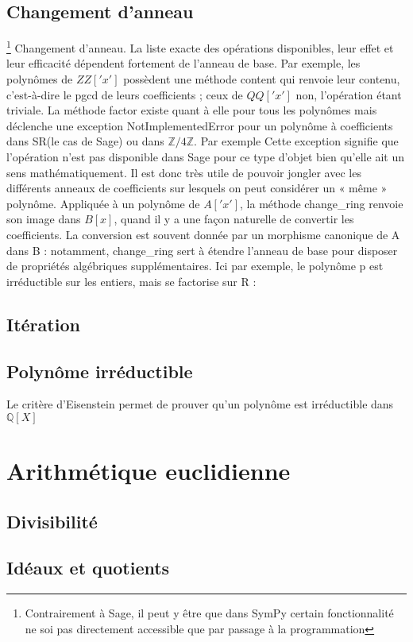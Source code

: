   \subsection{Changement d’anneau}\footnote{Contrairement à Sage, il peut y être que dans SymPy certain 
  fonctionnalité ne soi pas directement accessible que par passage à la programmation }
Changement d’anneau. La liste exacte des opérations disponibles, leur effet
et leur efficacité dépendent fortement de l’anneau de base. Par exemple, les
polynômes de $ZZ\left['x'\right]$ possèdent une méthode content qui renvoie leur contenu,
c’est-à-dire le pgcd de leurs coefficients ; ceux de $QQ\left['x'\right]$ non, l’opération étant
triviale. La méthode factor existe quant à elle pour tous les polynômes mais
déclenche une exception NotImplementedError pour un polynôme à coefficients
dans SR(le cas de Sage) ou dans $\mathbb{Z}/4\mathbb{Z}$. Par exemple Cette exception signifie que l’opération n’est pas disponible dans Sage pour ce type d’objet bien qu’elle ait un sens mathématiquement.
Il est donc très utile de pouvoir jongler avec les différents anneaux de coefficients
sur lesquels on peut considérer un « même » polynôme. Appliquée à un polynôme
de $A\left['x'\right]$, la méthode change\_ring renvoie son image dans $B\left[x\right]$, quand il y a une
façon naturelle de convertir les coefficients. La conversion est souvent donnée par
un morphisme canonique de A dans B : notamment, change\_ring sert à étendre
l’anneau de base pour disposer de propriétés algébriques supplémentaires. Ici par
exemple, le polynôme p est irréductible sur les entiers, mais se factorise sur R :
 \subsection{Itération}
 \subsection{Polyn\^ome irr\'eductible}
Le crit\`ere d'Eisenstein permet de prouver qu'un polyn\^ome est irr\'eductible dans $\mathbb{Q}\left[ X\right]$
 \section{Arithmétique euclidienne}
 \subsection{ Divisibilit\'e}
 \subsection{ Idéaux et quotients}
